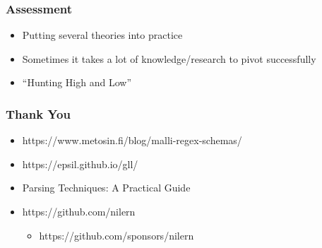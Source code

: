 \documentclass{beamer}
\begin{document}

\begin{frame}
\frametitle{Assessment}

\begin{itemize}
\item Putting several theories into practice
\item Sometimes it takes a lot of knowledge/research to pivot successfully
\item ``Hunting High and Low''
\end{itemize}
\end{frame}


\begin{frame}
\frametitle{Thank You}

\begin{itemize}
\item https://www.metosin.fi/blog/malli-regex-schemas/
\item https://epsil.github.io/gll/
\item Parsing Techniques: A Practical Guide
\item https://github.com/nilern
\begin{itemize}
    \item https://github.com/sponsors/nilern
\end{itemize}

\end{itemize}
\end{frame}
\end{document}
